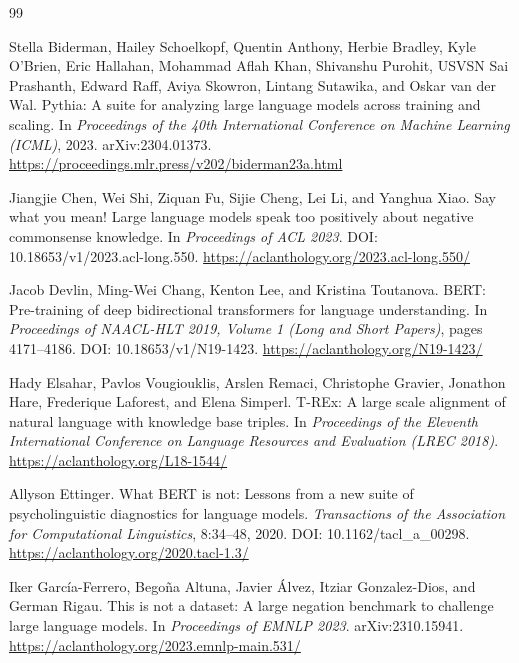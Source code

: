 \documentclass{article}
\begin{document}
\begin{thebibliography}{99}

Stella Biderman, Hailey Schoelkopf, Quentin Anthony, Herbie Bradley, Kyle O'Brien, Eric Hallahan,
Mohammad Aflah Khan, Shivanshu Purohit, USVSN Sai Prashanth, Edward Raff, Aviya Skowron, Lintang
Sutawika, and Oskar van der Wal.
Pythia: A suite for analyzing large language models across training and scaling.
In \emph{Proceedings of the 40th International Conference on Machine Learning (ICML)}, 2023.
arXiv:2304.01373. \url{https://proceedings.mlr.press/v202/biderman23a.html}

Jiangjie Chen, Wei Shi, Ziquan Fu, Sijie Cheng, Lei Li, and Yanghua Xiao.
Say what you mean! Large language models speak too positively about negative commonsense knowledge.
In \emph{Proceedings of ACL 2023}. DOI: 10.18653/v1/2023.acl-long.550.
\url{https://aclanthology.org/2023.acl-long.550/}

Jacob Devlin, Ming-Wei Chang, Kenton Lee, and Kristina Toutanova.
BERT: Pre-training of deep bidirectional transformers for language understanding.
In \emph{Proceedings of NAACL-HLT 2019, Volume 1 (Long and Short Papers)}, pages 4171--4186.
DOI: 10.18653/v1/N19-1423. \url{https://aclanthology.org/N19-1423/}

Hady Elsahar, Pavlos Vougiouklis, Arslen Remaci, Christophe Gravier, Jonathon Hare, Frederique Laforest,
and Elena Simperl.
T-REx: A large scale alignment of natural language with knowledge base triples.
In \emph{Proceedings of the Eleventh International Conference on Language Resources and Evaluation
(LREC 2018)}. \url{https://aclanthology.org/L18-1544/}

Allyson Ettinger.
What BERT is not: Lessons from a new suite of psycholinguistic diagnostics for language models.
\emph{Transactions of the Association for Computational Linguistics}, 8:34--48, 2020.
DOI: 10.1162/tacl\_a\_00298. \url{https://aclanthology.org/2020.tacl-1.3/}

Iker García-Ferrero, Begoña Altuna, Javier Álvez, Itziar Gonzalez-Dios, and German Rigau.
This is not a dataset: A large negation benchmark to challenge large language models.
In \emph{Proceedings of EMNLP 2023}. arXiv:2310.15941.
\url{https://aclanthology.org/2023.emnlp-main.531/}


\end{thebibliography}
\end{document}
